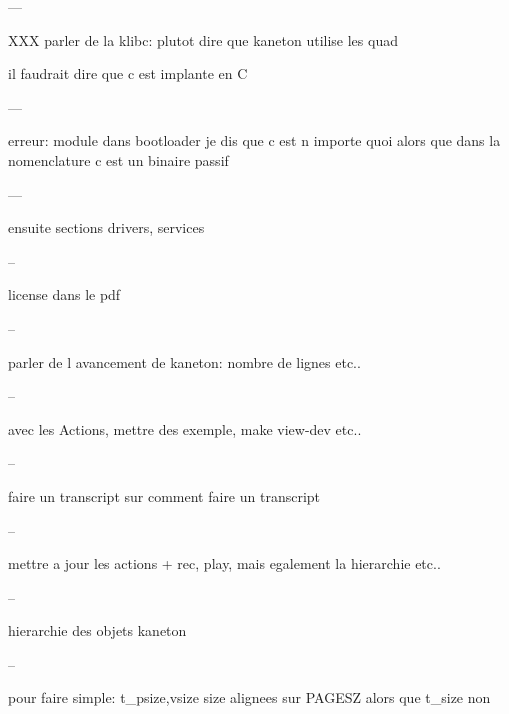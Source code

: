 ---

XXX parler de la klibc: plutot dire que kaneton utilise les quad

il faudrait dire que c est implante en C

---

erreur: module dans bootloader je dis que c est n importe quoi alors
 que dans la nomenclature c est un binaire passif

---

ensuite sections drivers, services

--

license dans le pdf

--

parler de l avancement de kaneton: nombre de lignes etc..

--

avec les Actions, mettre des exemple, make view-dev etc..

--

faire un transcript sur comment faire un transcript

--

mettre a jour les actions + rec, play, mais egalement la hierarchie etc..

--

hierarchie des objets kaneton

--

pour faire simple: t_{psize,vsize} size alignees sur PAGESZ alors
 que t_size non
